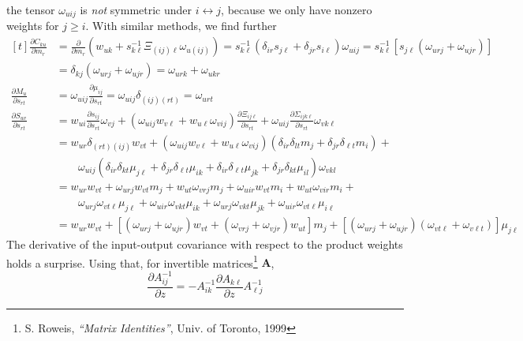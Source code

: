 \documentclass[a4paper]{article}
\newcommand{\mat}[1]{\boldsymbol{#1}}
\newcommand{\<}{\langle}
\renewcommand{\>}{\rangle}
\newcommand{\de}{\partial}
\begin{document}
the tensor $\omega_{uij}$ is \emph{not} symmetric under
$i\leftrightarrow j$, because we only have nonzero weights for $j\geq i$.
With similar methods, we find further
\begin{equation}
  \label{eq:13}
  \begin{aligned}[t]
    \frac{\de C_{ku}}{\de m_r} &= \frac{\de}{\de m_r} \left( w_{uk} +
      s^{-1} _{k\ell} \Xi_{(ij)\ell} \omega_{u(ij)} \right)
    = s^{-1} _{k\ell} (\delta_{ir} s_{j\ell} + \delta_{jr} s_{i\ell})
    \omega_{uij}
    = s^{-1} _{k\ell} [s_{j\ell} (\omega_{urj} + \omega_{ujr})]\\
    &=\delta_{kj} (\omega_{urj} + \omega_{ujr}) = \omega_{urk} + \omega_{ukr} \\
    \frac{\de M_{u}}{\de s_{rt}}  &= \omega_{uij}\frac{\de
      \mu_{ij}}{\de s_{rt}} = \omega_{uij}\delta_{(ij)(rt)} =
    \omega_{urt}\\
    \frac{\de S_{uv}}{\de s_{rt}} &= w_{ui} \frac{\de s_{ij}}{\de
      s_{rt}} \omega_{vj} +(\omega_{uij}w_{v\ell} + w_{u\ell}\omega_{vij})\frac{\de
      \Xi_{ij\ell}}{\de s_{rt}} + \omega_{uij}\frac{\de \Sigma_{ijk\ell}}{\de s_{rt}}
    \omega_{vk\ell}\\
    &= w_{ur}\delta_{(rt)(ij)} w_{vt} + (\omega_{uij}w_{v\ell} +
    w_{u\ell}\omega_{vij}) (\delta_{ir}\delta_{lt}m_{j} +
    \delta_{jr}\delta_{\ell t} m_i) +\\
    & \qquad \omega_{uij}(\delta_{ir}\delta_{kt}\mu_{j\ell} +
    \delta_{jr}\delta_{\ell t} \mu_{ik} + \delta_{ir}\delta_{\ell t}
    \mu_{jk} + \delta_{jr}\delta_{kt}\mu_{il}) \omega_{vkl}\\
    &= w_{ur}w_{vt} + \omega_{urj} w_{vt}m_j + w_{ut} \omega_{vrj} m_j
    + \omega_{uir}w_{vt}m_i + w_{ut}\omega_{vir}m_i + \\
    &\qquad \omega_{urj}\omega_{vt\ell} \mu_{j\ell} +
    \omega_{uir}\omega_{vkt}\mu_{ik} + \omega_{urj} \omega_{vkt}
    \mu_{jk} + \omega_{uir}\omega_{vt\ell}\mu_{i\ell}\\
    &= w_{ur}w_{vt} + [(\omega_{urj}+\omega_{ujr})w_{vt} +
    (\omega_{vrj} + \omega_{vjr})w_{ut} ]m_j +
    [(\omega_{urj} + \omega_{ujr})(\omega_{vt\ell} + \omega_{v\ell t})]\mu_{j\ell}
  \end{aligned}
\end{equation}
The derivative of the input-output covariance with respect to the
product weights holds a surprise. Using that, for invertible
matrices\footnote{S. Roweis, \emph{``Matrix Identities''}, Univ. of
  Toronto, 1999} $\mat{A}$,
\begin{equation}
  \label{eq:14}
  \frac{\de A_{ij} ^{-1}}{\de z} = - A^{-1} _{ik} \frac{\de A_{k\ell}}{\de
    z} A^{-1} _{\ell j}
\end{equation}
\end{document}
